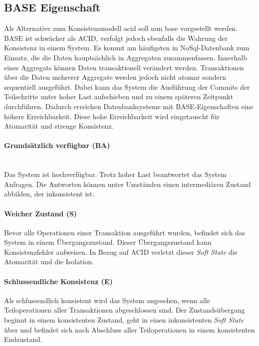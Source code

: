 \subsection{BASE Eigenschaft}
Als Alternative zum Konsistenzmodell \acrshort{acid} soll nun \acrfull{base} vorgestellt werden. BASE ist schwächer als ACID, verfolgt jedoch ebenfalls die Wahrung der Konsistenz in einem System. Es kommt am häufigsten in NoSql-Datenbank zum Einsatz, die die Daten hauptsächlich in Aggregaten zusammenfassen. Innerhalb eines Aggregats können Daten transaktionell verändert werden. Transaktionen über die Daten mehrerer Aggregate werden jedoch nicht atomar sondern sequentiell ausgeführt. Dabei kann das System die Ausführung der Commits der Teilschritte unter hoher Last aufschieben und zu einem späteren Zeitpunkt durchführen. Dadurch erreichen Datenbanksysteme mit BASE-Eigenschaften eine höhere Erreichbarkeit. Diese hohe Erreichbarkeit wird eingetauscht für Atomarität und strenge Konsistenz. 

\paragraph*{Grundsätzlich verfügbar (BA)}\mbox{}\\
Das System ist hochverfügbar. Trotz hoher Last beantwortet das System Anfragen. Die Antworten können unter Umständen einen intermediären Zustand abbilden, der inkonsistent ist. 

\paragraph*{Weicher Zustand (S)}
Bevor alle Operationen einer Transaktion ausgeführt wurden, befindet sich das System in einem Übergangszustand. Dieser Übergangszustand kann Konsistenzfehler aufweisen. In Bezug auf ACID verletzt dieser \textit{Soft State} die Atomarität und die Isolation.

\paragraph*{Schlussendliche Konsistenz (E)}
Als schlussendlich konsistent wird das System angesehen, wenn alle Teiloperationen aller Transaktionen abgeschlossen sind. Der Zustandsübergang beginnt in einem konsistenten Zustand, geht in einen inkonsistenten \textit{Soft State} über und befindet sich nach Abschluss aller Teiloperationen in einem konsistenten Endzustand. 